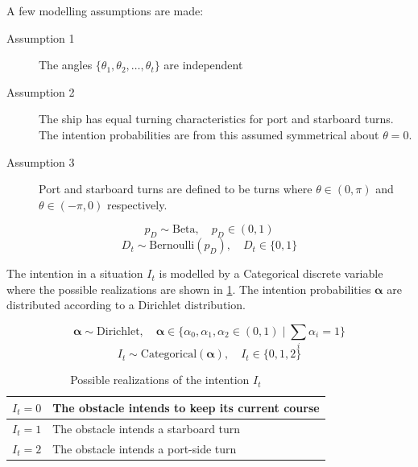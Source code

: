 A few modelling assumptions are made:

\begin{description}
    \item[Assumption 1] The angles $\{\theta_1, \theta_2, \dots, \theta_t\}$ are independent
    \item[Assumption 2] The ship has equal turning characteristics for port and starboard turns. The intention probabilities are from this assumed symmetrical about $\theta=0$. 
    \item[Assumption 3] Port and starboard turns are defined to be turns where $\theta \in (0, \pi)$ and $\theta \in (-\pi, 0)$ respectively.  
\end{description}

\begin{equation}
    p_D \sim \text{Beta}, \quad p_D \in (0, 1)
\end{equation}
\begin{equation}
    D_t \sim \text{Bernoulli}(p_D), \quad D_t \in \{0, 1\}
\end{equation}

The intention in a situation $I_t$ is modelled by a Categorical discrete variable where the possible realizations are shown in \cref{tbl:intentions}. The intention probabilities $\boldsymbol{\alpha}$ are distributed according to a Dirichlet distribution.

\begin{equation}
    \boldsymbol{\alpha} \sim \text{Dirichlet}, \quad \boldsymbol{\alpha} \in \{\alpha_0, \alpha_1, \alpha_2 \in (0, 1) \; | \; \sum_i \alpha_i = 1 \}
\end{equation}
\begin{equation}
    I_t \sim \text{Categorical}(\boldsymbol{\alpha}), \quad I_t \in \{0, 1, 2\}
\end{equation}

\begin{table}[h]
\centering
\begin{tabular}{|l|l|}
\hline
$I_t=0$ & The obstacle intends to keep its current course \\ \hline
$I_t=1$ & The obstacle intends a starboard turn           \\ \hline
$I_t=2$ & The obstacle intends a port-side turn            \\ \hline
\end{tabular}
\caption{Possible realizations of the intention $I_t$}
\label{tbl:intentions}
\end{table}


